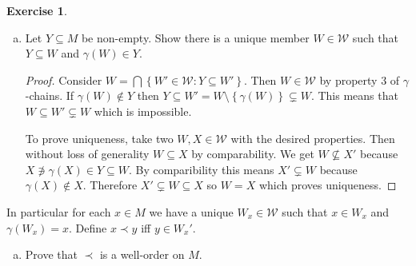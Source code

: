 \documentclass{article}
\newtheorem*{lemma}{Lemma}
\theoremstyle{definition}
\newtheorem{question}{Exercise}
\newcommand{\set}[1]{\left\{#1\right\}}
\newcommand{\setwith}[2]{\set{#1\colon#2}}
\begin{document}
\begin{question}
\begin{enumerate}[a.,resume]
\begin{proof}
\begin{lemma}
\begin{proof}
                          This proves all properties of a \(\gamma\) chain hold
                          for \(\mathcal{U}\).
                      \end{proof}
                  \end{lemma}

                  Therefore \(\mathcal{U}\subseteq\mathcal{W}\) is a chain so
                  \(\mathcal{U}=\mathcal{W}\) and \(A'\) is comparable.

                  Take any \(\mathcal{A}'\subseteq\mathcal{W}'\). Then
                  \(\bigcap\mathcal{A}'\in\mathcal{W}\). Take any
                  \(U\in\mathcal{W}\). If for all \(A\in\mathcal{A}'\) we have
                  \(U\subseteq A\) we get \(U\subseteq\bigcap\mathcal{A}'\). If
                  there is an \(A\in\mathcal{A}'\) such that \(A\subsetneq U\)
                  then \(\bigcap\mathcal{A}'\subseteq U\). This means that
                  \(\bigcap\mathcal{A}'\) is comparable so an element of
                  \(\mathcal{W}'\).

                  This means that \(\mathcal{W}'\subseteq\mathcal{W}\) is a
                  chain so \(\mathcal{W}=\mathcal{W}'\) i.e. every element of
                  \(\mathcal{W}\) is comparable.
              \end{proof}

        \item Let \(Y\subseteq M\) be non-empty. Show there is a unique member
              \(W\in\mathcal{W}\) such that \(Y\subseteq W\) and \(\gamma(W)\in
              Y\).

              \begin{proof}
                  Consider \(W=\bigcap\setwith{W'\in\mathcal{W}}{Y\subseteq
                      W'}\). Then \(W\in\mathcal{W}\) by property 3 of
                  \(\gamma\)-chains. If \(\gamma(W)\notin Y\) then
                  \(Y\subseteq W'=W\setminus\set{\gamma(W)}\subsetneq W\).
                  This means that \(W\subseteq W'\subsetneq W\) which is
                  impossible.

                  To prove uniqueness, take two \(W,X\in\mathcal{W}\) with the
                  desired properties. Then without loss of generality
                  \(W\subseteq X\) by comparability. We get \(W\nsubseteq X'\)
                  because \(X\not\ni\gamma(X)\in Y\subseteq W\). By
                  comparibility this means \(X'\subsetneq W\) because
                  \(\gamma(X)\notin X\). Therefore \(X'\subsetneq W\subseteq X\)
                  so \(W=X\) which proves uniqueness.
              \end{proof}
    \end{enumerate}
    In particular for each \(x\in M\) we have a unique \(W_{x}\in\mathcal{W}\)
    such that \(x\in W_{x}\) and \(\gamma(W_{x})=x\). Define \(x\prec y\) iff
    \(y\in W_{x}'\).
    \begin{enumerate}[a.,resume]
        \item Prove that \(\prec\) is a well-order on \(M\).


\end{enumerate}
\end{question}
\end{document}
